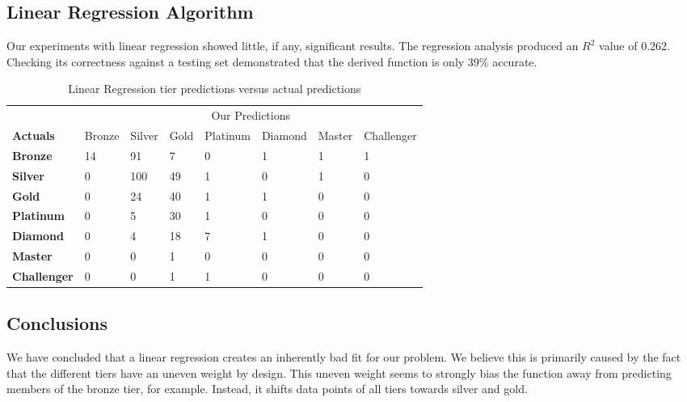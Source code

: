 \documentclass{article} %
\begin{document}
\subsection{Linear Regression Algorithm}
Our experiments with linear regression showed little, if any, significant results. The regression analysis produced an $R^2$ value of 0.262. Checking its correctness against a testing set demonstrated that the derived function is only 39\% accurate.

\begin{table}[]
\centering
\caption{Linear Regression tier predictions versus actual predictions}
\label{my-label}
\begin{tabular}{llllllll}
\multicolumn{1}{c}{} & \multicolumn{7}{c}{Our Predictions}                               \\
\textbf{Actuals}     & Bronze & Silver & Gold & Platinum & Diamond & Master & Challenger \\
\textbf{Bronze}      & 14     & 91     & 7    & 0        & 1       & 1      & 1          \\
\textbf{Silver}      & 0      & 100    & 49   & 1        & 0       & 1      & 0          \\
\textbf{Gold}        & 0      & 24     & 40   & 1        & 1       & 0      & 0          \\
\textbf{Platinum}    & 0      & 5      & 30   & 1        & 0       & 0      & 0          \\
\textbf{Diamond}     & 0      & 4      & 18   & 7        & 1       & 0      & 0          \\
\textbf{Master}      & 0      & 0      & 1    & 0        & 0       & 0      & 0          \\
\textbf{Challenger}  & 0      & 0      & 1    & 1        & 0       & 0      & 0         
\end{tabular}
\end{table}

\subsection{Conclusions}

We have concluded that a linear regression creates an inherently bad fit for our problem. We believe this is primarily caused by the fact that the different tiers have an uneven weight by design. This uneven weight seems to strongly bias the function away from predicting members of the bronze tier, for example. Instead, it shifts data points of all tiers towards silver and gold.
\end{document}
